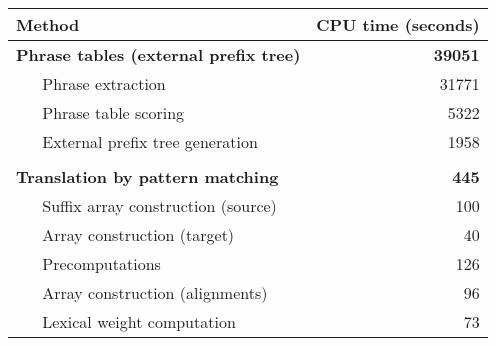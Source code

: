 \begin{tabular}{llr}
	\multicolumn{2}{l}{Method} & CPU time (seconds) \\ \hline
	\multicolumn{2}{l}{\bf Phrase tables (external prefix tree)} & {\bf 39051}\\
	~ & Phrase extraction & 31771\\
	~ & Phrase table scoring & 5322\\
	~ & External prefix tree generation & 1958\\ \\
	\multicolumn{2}{l}{\bf Translation by pattern matching} & {\bf 445} \\
	~ & Suffix array construction (source) & 100\\
	~ & Array construction (target) & 40\\
	~ & Precomputations & 126\\
	~ & Array construction (alignments) & 96\\
	~ & Lexical weight computation & 73\\
\end{tabular}
